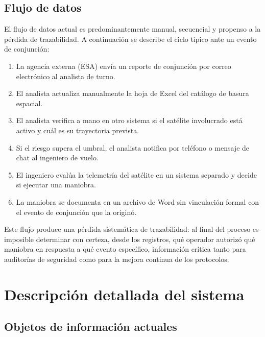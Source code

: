\subsection{Flujo de datos}

El flujo de datos actual es predominantemente manual, secuencial y propenso a la pérdida de trazabilidad. A continuación se describe el ciclo típico ante un evento de conjunción:

\begin{enumerate}
    \item La agencia externa (ESA) envía un reporte de conjunción por correo electrónico al analista de turno.
    \item El analista actualiza manualmente la hoja de Excel del catálogo de basura espacial.
    \item El analista verifica a mano en otro sistema si el satélite involucrado está activo y cuál es su trayectoria prevista.
    \item Si el riesgo supera el umbral, el analista notifica por teléfono o mensaje de chat al ingeniero de vuelo.
    \item El ingeniero evalúa la telemetría del satélite en un sistema separado y decide si ejecutar una maniobra.
    \item La maniobra se documenta en un archivo de Word sin vinculación formal con el evento de conjunción que la originó.
\end{enumerate}

Este flujo produce una pérdida sistemática de trazabilidad: al final del proceso es imposible determinar con certeza, desde los registros, qué operador autorizó qué maniobra en respuesta a qué evento específico, información crítica tanto para auditorías de seguridad como para la mejora continua de los protocolos.

\section{Descripción detallada del sistema}

\subsection{Objetos de información actuales}

